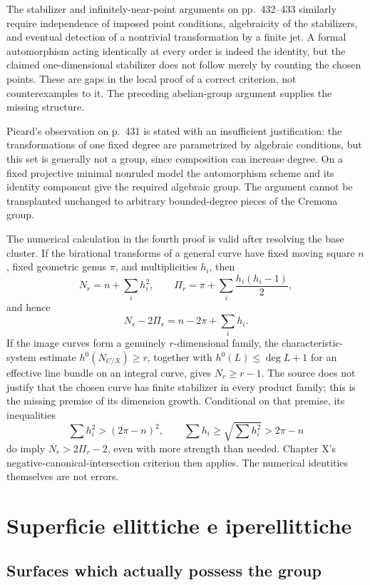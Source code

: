 The stabilizer and infinitely-near-point arguments on pp.~432--433 similarly require independence of imposed point conditions, algebraicity of the stabilizers, and eventual detection of a nontrivial transformation by a finite jet. A formal automorphism acting identically at every order is indeed the identity, but the claimed one-dimensional stabilizer does not follow merely by counting the chosen points. These are gaps in the local proof of a correct criterion, not counterexamples to it. The preceding abelian-group argument supplies the missing structure.

Picard's observation on p.~431 is stated with an insufficient justification: the transformations of one fixed degree are parametrized by algebraic conditions, but this set is generally not a group, since composition can increase degree. On a fixed projective minimal nonruled model the automorphism scheme and its identity component give the required algebraic group. The argument cannot be transplanted unchanged to arbitrary bounded-degree pieces of the Cremona group.

The numerical calculation in the fourth proof is valid after resolving the base cluster. If the birational transforms of a general curve have fixed moving square \(n\), fixed geometric genus \(\pi\), and multiplicities \(h_i\), then
\[
N_r=n+\sum_i h_i^2,\qquad
\Pi_r=\pi+\sum_i\frac{h_i(h_i-1)}2,
\]
and hence
\[
N_r-2\Pi_r=n-2\pi+\sum_i h_i.
\]
If the image curves form a genuinely \(r\)-dimensional family, the characteristic-system estimate \(h^0(N_{C/X})\ge r\), together with \(h^0(L)\le\deg L+1\) for an effective line bundle on an integral curve, gives \(N_r\ge r-1\). The source does not justify that the chosen curve has finite stabilizer in every product family; this is the missing premise of its dimension growth. Conditional on that premise, its inequalities
\[
\sum h_i^2>(2\pi-n)^2,\qquad
\sum h_i\ge\sqrt{\sum h_i^2}>2\pi-n
\]
do imply \(N_r>2\Pi_r-2\), even with more strength than needed. Chapter X's negative-canonical-intersection criterion then applies. The numerical identities themselves are not errors.

\section{Superficie ellittiche e iperellittiche}
\label{cp2-xi-3}

\subsection{Surfaces which actually possess the group}

